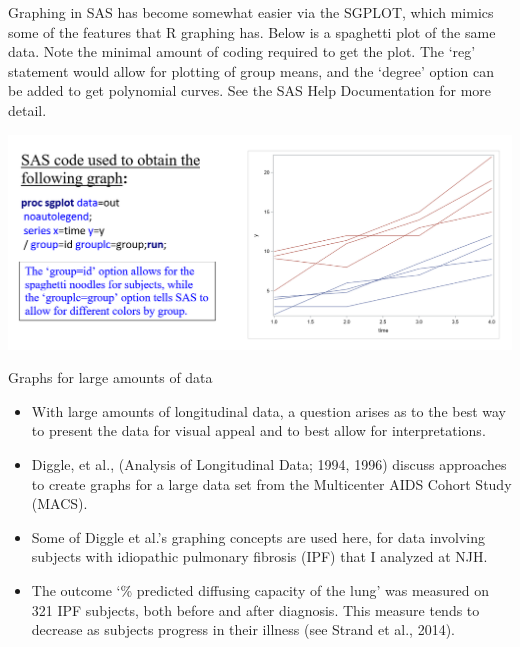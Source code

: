 \documentclass[
  9pt,
  ignorenonframetext,
]{beamer}
\begin{document}
\begin{frame}{}
\protect\hypertarget{section-5}{}
Graphing in SAS has become somewhat easier via the SGPLOT, which mimics
some of the features that R graphing has. Below is a spaghetti plot of
the same data. Note the minimal amount of coding required to get the
plot. The `reg' statement would allow for plotting of group means, and
the `degree' option can be added to get polynomial curves. See the SAS
Help Documentation for more detail.

\tiny

\begin{center}\includegraphics[width=1\linewidth]{figs_L2/L2-f3} \end{center}

\tiny
\end{frame}

\begin{frame}{Graphs for large amounts of data}
\protect\hypertarget{graphs-for-large-amounts-of-data}{}
\begin{itemize}
\item
  With large amounts of longitudinal data, a question arises as to the
  best way to present the data for visual appeal and to best allow for
  interpretations.
\item
  Diggle, et al., (Analysis of Longitudinal Data; 1994, 1996) discuss
  approaches to create graphs for a large data set from the Multicenter
  AIDS Cohort Study (MACS).
\item
  Some of Diggle et al.'s graphing concepts are used here, for data
  involving subjects with idiopathic pulmonary fibrosis (IPF) that I
  analyzed at NJH.
\item
  The outcome `\% predicted diffusing capacity of the lung' was measured
  on 321 IPF subjects, both before and after diagnosis. This measure
  tends to decrease as subjects progress in their illness (see Strand et
  al., 2014).
\end{itemize}
\end{frame}
\end{document}
